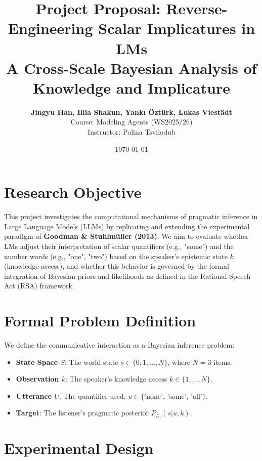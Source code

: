 \documentclass[11pt]{article}
\title{\textbf{Project Proposal: Reverse-Engineering Scalar Implicatures in LMs \\ \large A Cross-Scale Bayesian Analysis of Knowledge and Implicature}}
\author{\textbf{Jingyu Han, Illia Shakun, Yankı Öztürk, Lukas Viestädt} \\ 
Course: Modeling Agents (WS2025/26) \\
Instructor: Polina Tsvilodub}
\date{\today}
\begin{document}
\maketitle

\section{Research Objective}
This project investigates the computational mechanisms of pragmatic inference in Large Language Models (LLMs) 
by replicating and extending the experimental paradigm 
of \textbf{Goodman \& Stuhlmüller (2013)}. We aim to evaluate whether LMs 
adjust their interpretation of scalar quantifiers (e.g., "some") and the
number words (e.g., "one", "two")  
based on the speaker's epistemic state $k$ (knowledge access), 
and whether this behavior is governed by the formal integration 
of Bayesian priors and likelihoods as defined in the Rational Speech 
Act (RSA) framework.

\section{Formal Problem Definition}
We define the communicative interaction as a Bayesian inference problem:
\begin{itemize}
    \item \textbf{State Space $S$}: The world state $s \in \{0, 1, \dots, N\}$, where $N=3$ items.
    \item \textbf{Observation $k$}: The speaker's knowledge access $k \in \{1, \dots, N\}$.
    \item \textbf{Utterance $U$}: The quantifier used, $u \in \{\text{'none', 'some', 'all'}\}$.
    \item \textbf{Target}: The listener's pragmatic posterior $P_{L_1}(s | u, k)$.
\end{itemize}

\section{Experimental Design}
\end{document}
